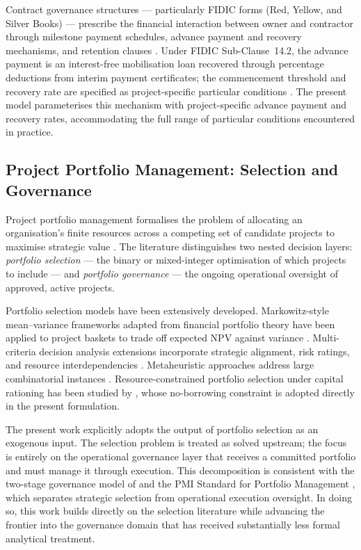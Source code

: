 Contract governance structures --- particularly FIDIC forms (Red,
Yellow, and Silver Books) --- prescribe the financial interaction
between owner and contractor through milestone payment schedules,
advance payment and recovery mechanisms, and retention clauses
\citep{FIDIC2017}. Under FIDIC Sub-Clause~14.2, the advance payment
is an interest-free mobilisation loan recovered through percentage
deductions from interim payment certificates; the commencement
threshold and recovery rate are specified as project-specific
particular conditions \citep{FIDIC2017}. The present model
parameterises this mechanism with project-specific advance payment
and recovery rates, accommodating the full range of particular
conditions encountered in practice.

\subsection{Project Portfolio Management: Selection and Governance}
\label{subsec:lr_ppm}

Project portfolio management formalises the problem of allocating an
organisation's finite resources across a competing set of candidate
projects to maximise strategic value \citep{Archer1999, Cooper2001}.
The literature distinguishes two nested decision layers:
\emph{portfolio selection} --- the binary or mixed-integer
optimisation of which projects to include --- and \emph{portfolio
governance} --- the ongoing operational oversight of approved, active
projects.

Portfolio selection models have been extensively developed.
Markowitz-style mean--variance frameworks adapted from financial
portfolio theory \citep{Markowitz1952} have been applied to project
baskets to trade off expected NPV against variance \citep{Eilat2006}.
Multi-criteria decision analysis extensions incorporate strategic
alignment, risk ratings, and resource interdependencies
\citep{Martinsuo2007, Killen2008}. Metaheuristic approaches address
large combinatorial instances \citep{Zhang2020}. Resource-constrained
portfolio selection under capital rationing has been studied by
\citet{kavadias2003resource}, whose no-borrowing constraint is adopted
directly in the present formulation.

The present work explicitly adopts the output of portfolio selection
as an exogenous input. The selection problem is treated as solved
upstream; the focus is entirely on the operational governance layer
that receives a committed portfolio and must manage it through
execution. This decomposition is consistent with the two-stage
governance model of \citet{Turner2014} and the PMI Standard for
Portfolio Management \citep{PMI2017}, which separates strategic
selection from operational execution oversight. In doing so, this
work builds directly on the selection literature while advancing the
frontier into the governance domain that has received substantially
less formal analytical treatment.

